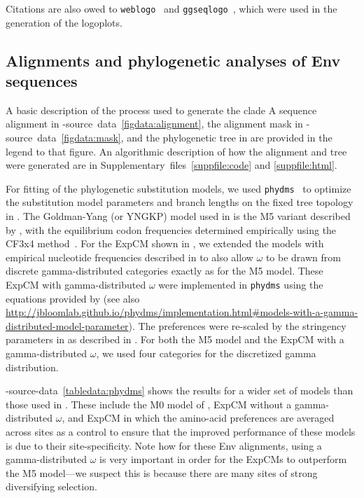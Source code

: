 \documentclass[9pt]{elife}
\begin{document}
Citations are also owed to \texttt{weblogo}~\citep[][\url{http://weblogo.threeplusone.com/}]{crooks2004weblogo} and \texttt{ggseqlogo}~\citep[][\url{https://omarwagih.github.io/ggseqlogo/}]{wagih2017ggseqlogo}, which were used in the generation of the logoplots. 

\subsection{Alignments and phylogenetic analyses of Env sequences}
A basic description of the process used to generate the clade A sequence alignment in -source~data~\ref{figdata:alignment}, the alignment mask in -source~data~\ref{figdata:mask}, and the phylogenetic tree in  are provided in the legend to that figure.
An algorithmic description of how the alignment and tree were generated are in Supplementary~files~\ref{suppfile:code} and \ref{suppfile:html}.

For fitting of the phylogenetic substitution models, we used \texttt{phydms}~\citep[][\url{http://jbloomlab.github.io/phydms/}, version 2.2.1]{hilton2017phydms} to optimize the substitution model parameters and branch lengths on the fixed tree topology in .
The Goldman-Yang (or YNGKP) model used in  is the M5 variant described by \citet{yang2000codon}, with the equilibrium codon frequencies determined empirically using the CF3x4 method~\citep{pond2010correcting}.
For the ExpCM shown in , we extended the models with empirical nucleotide frequencies described in \citet{hilton2017phydms} to also allow $\omega$ to be drawn from discrete gamma-distributed categories exactly as for the M5 model.
These ExpCM with gamma-distributed $\omega$ were implemented in \texttt{phydms} using the equations provided by \citet{yang1994maximum} (see also \url{http://jbloomlab.github.io/phydms/implementation.html#models-with-a-gamma-distributed-model-parameter}).
The preferences were re-scaled by the stringency parameters in  as described in \citet{hilton2017phydms}.
For both the M5 model and the ExpCM with a gamma-distributed $\omega$, we used four categories for the discretized gamma distribution.

-source-data~\ref{tabledata:phydms} shows the results for a wider set of models than those used in . 
These include the M0 model of \citet{yang2000codon}, ExpCM without a gamma-distributed $\omega$, and ExpCM in which the amino-acid preferences are averaged across sites as a control to ensure that the improved performance of these models is due to their site-specificity.
Note how for these Env alignments, using a gamma-distributed $\omega$ is very important in order for the ExpCMs to outperform the M5 model---we suspect this is because there are many sites of strong diversifying selection.
\end{document}
